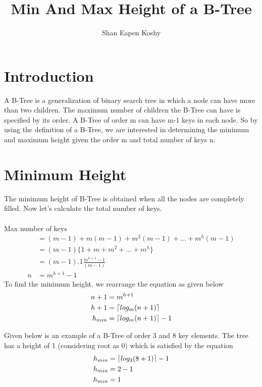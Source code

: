 \documentclass[11pt,a4paper]{article}
\author{
 Shan Eapen Koshy
}
\DeclarePairedDelimiter\ceil{\lceil}{\rceil}
\begin{document}
\title{Min And Max Height of a B-Tree}
\maketitle

\section{Introduction}
A B-Tree is a generalization of binary search tree in which a node can have more than two children. The maximum number of children the B-Tree can have is specified by its order. A B-Tree of order m can have m-1 keys in each node.
So by using the definition of a B-Tree, we are interested in determining the minimum and maximum height given the order m and total number of keys n.


\section{Minimum Height}
The minimum height of B-Tree is obtained when all the nodes are completely filled. Now let's calculate the total number of keys. 
\\\\Max number of keys
\begin{align*}
&= (m-1) + m(m-1) + m^2(m-1) + ... + m^h(m-1)\\
&= (m-1)\{1+m+m^2+...+m^h\}\\
&= (m-1).1\frac{m^{h+1}-1}{(m-1)}\\
n &= m^{h+1}-1
\end{align*}
To find the minimum height, we rearrange the equation as given below
\begin{align*}
n+1 &= m^{h+1}\\
h+1 &= \ceil{log_m (n+1)} \\
h_{min} &= \ceil{log_m (n+1)}-1
\end{align*}

Given below is an example of a B-Tree of order 3 and 8 key elements. The tree has a height of 1 (considering root as 0) which is satisfied by the equation
\begin{align*}
h_{min} &= \ceil{log_3 {(8+1)}}-1 \\
h_{min} &= 2-1 \\
h_{min} &= 1
\end{align*} 

\begin{center}
\end{center}
\end{document}
